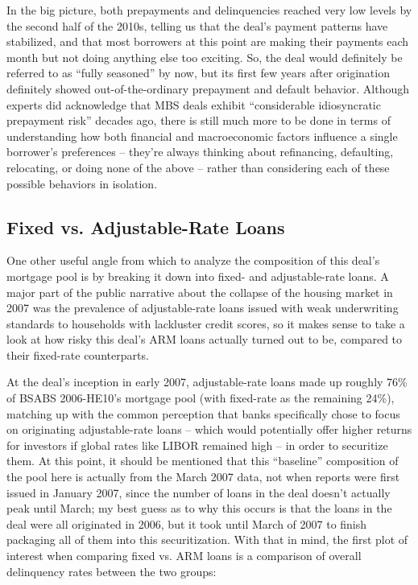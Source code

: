\documentclass[12pt]{article}
\begin{document}
In the big picture, both prepayments and delinquencies reached very low levels by the second half of the 2010s, telling us that the deal’s payment patterns have stabilized, and that most borrowers at this point are making their payments each month but not doing anything else too exciting. So, the deal would definitely be referred to as “fully seasoned” by now, but its first few years after origination definitely showed out-of-the-ordinary prepayment and default behavior. Although experts did acknowledge that MBS deals exhibit “considerable idiosyncratic prepayment risk” \textcite{becketti89} decades ago, there is still much more to be done in terms of understanding how both financial and macroeconomic factors influence a single borrower’s preferences – they’re always thinking about refinancing, defaulting, relocating, or doing none of the above – rather than considering each of these possible behaviors in isolation.


\subsection*{Fixed vs. Adjustable-Rate Loans}

One other useful angle from which to analyze the composition of this deal’s mortgage pool is by breaking it down into fixed- and adjustable-rate loans. A major part of the public narrative about the collapse of the housing market in 2007 was the prevalence of adjustable-rate loans issued with weak underwriting standards to households with lackluster credit scores, so it makes sense to take a look at how risky this deal’s ARM loans actually turned out to be, compared to their fixed-rate counterparts.

At the deal’s inception in early 2007, adjustable-rate loans made up roughly 76\% of BSABS 2006-HE10’s mortgage pool (with fixed-rate as the remaining 24\%), matching up with the common perception that banks specifically chose to focus on originating adjustable-rate loans – which would potentially offer higher returns for investors if global rates like LIBOR remained high – in order to securitize them. At this point, it should be mentioned that this “baseline” composition of the pool here is actually from the March 2007 data, not when reports were first issued in January 2007, since the number of loans in the deal doesn’t actually peak until March; my best guess as to why this occurs is that the loans in the deal were all originated in 2006, but it took until March of 2007 to finish packaging all of them into this securitization. With that in mind, the first plot of interest when comparing fixed vs. ARM loans is a comparison of overall delinquency rates between the two groups:
\end{document}
